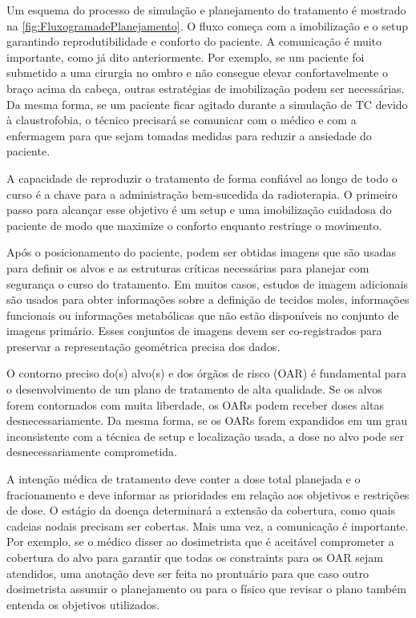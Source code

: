 \documentclass[11pt,a4paper]{article}
\newcounter{exemplo}
\begin{document}
	Um esquema do processo de simulação e planejamento do tratamento é mostrado na \ref{fig:FluxogramadePlanejamento}. O fluxo começa com a imobilização e o setup garantindo reprodutibilidade e conforto do paciente. A comunicação é muito importante, como já dito anteriormente. Por exemplo, se um paciente foi submetido a uma cirurgia no ombro e não consegue elevar confortavelmente o braço acima da cabeça, outras estratégias de imobilização podem ser necessárias. Da mesma forma, se um paciente ficar agitado durante a simulação de TC devido à claustrofobia, o técnico precisará se comunicar com o médico e com a enfermagem para que sejam tomadas medidas para reduzir a ansiedade do paciente.

	A capacidade de reproduzir o tratamento de forma confiável ao longo de todo o curso é a chave para a administração bem-sucedida da radioterapia. O primeiro passo para alcançar esse objetivo é um setup e uma imobilização cuidadosa do paciente de modo que maximize o conforto enquanto restringe o movimento.

	Após o posicionamento do paciente, podem ser obtidas imagens que são usadas para definir os alvos e as estruturas críticas necessárias para planejar com segurança o curso do tratamento. Em muitos casos, estudos de imagem adicionais são usados para obter informações sobre a definição de tecidos moles, informações funcionais ou informações metabólicas que não estão disponíveis no conjunto de imagens primário. Esses conjuntos de imagens devem ser co-registrados para preservar a representação geométrica precisa dos dados.

	O contorno preciso do(s) alvo(s) e dos órgãos de risco (OAR) é fundamental para o desenvolvimento de um plano de tratamento de alta qualidade. Se os alvos forem contornados com muita liberdade, os OARs podem receber doses altas desnecessariamente. Da mesma forma, se os OARs forem expandidos em um grau inconsistente com a técnica de setup e localização usada, a dose no alvo pode ser desnecessariamente comprometida.

	

	A intenção médica de tratamento deve conter a dose total planejada e o fracionamento e deve informar as prioridades em relação aos objetivos e restrições de dose. O estágio da doença determinará a extensão da cobertura, como quais cadeias nodais precisam ser cobertas. Mais uma vez, a comunicação é importante. Por exemplo, se o médico disser ao dosimetrista que é aceitável comprometer a cobertura do alvo para garantir que todas os constraints para os OAR sejam atendidos, uma anotação deve ser feita no prontuário para que caso outro dosimetrista assumir o planejamento ou para o físico que revisar o plano também entenda os objetivos utilizados.
\end{document}
